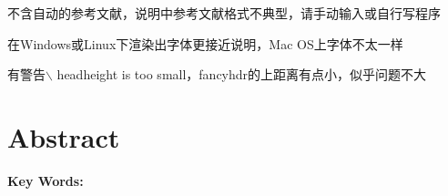 \documentclass[UTF8,openany,AutoFakeBold,AutoFakeSlant,cs4size]{ctexbook}
\begin{document}
不含自动的参考文献，说明中参考文献格式不典型，请手动输入或自行写程序

在Windows或Linux下渲染出字体更接近说明，Mac OS上字体不太一样

有警告$\backslash$ headheight is too small，fancyhdr的上距离有点小，似乎问题不大

\bigskip
{}



{
	\fancyhf{} %



	\fancyfoot[CO,CE]{~\thepage~}

	\renewcommand{\headrulewidth}{0.7pt} %

	\renewcommand{\footrulewidth}{0pt} %
}

\fancyhf{}
\fancyfoot[CO,CE]{~\thepage~}
\renewcommand{\headrulewidth}{0.7pt}
\renewcommand{\footrulewidth}{0pt}
\clearpage






\small
\linespread{1.5}\selectfont
\chapter*{\bfseries Abstract}

\bigskip
\noindent
{\bfseries Key Words: }



{
	\fancyhf{}
	\fancyfoot[CO,CE]{~\thepage~}
	\renewcommand{\headrulewidth}{0.7pt}
	\renewcommand{\footrulewidth}{0pt}
}
\fancyhf{}
\fancyfoot[CO,CE]{~\thepage~}
\renewcommand{\headrulewidth}{0.7pt}
\renewcommand{\footrulewidth}{0pt}
\clearpage
\end{document}
